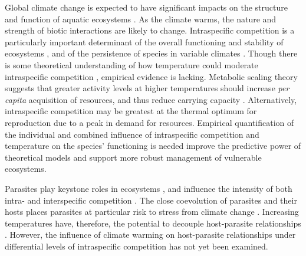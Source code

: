 Global climate change is expected to have significant impacts on the structure and function of aquatic ecosystems \citep{carpenter2011, ogorman2012}. As the climate warms, the nature and strength of biotic interactions are likely to change. Intraspecific competition is a particularly important determinant of  the overall functioning and stability of ecosystems \citep{barabas2016}, and of the persistence of species in variable climates \citep{pilfold2014, stenseth2015}. Though there is some theoretical understanding of how temperature could moderate intraspecific competition \citep{amarasekare2015}, empirical evidence is lacking. Metabolic scaling theory suggests that greater activity levels at higher temperatures should increase \emph{per capita} acquisition of resources, and thus reduce carrying capacity \citep{savage2004}. Alternatively, intraspecific competition may be greatest at the thermal optimum for reproduction due to a peak in demand for resources. Empirical quantification of the individual and combined influence of intraspecific competition and temperature on the species' functioning is needed improve the predictive power of theoretical models and support more robust management of vulnerable ecosystems. 

Parasites play keystone roles in ecosystems \citep{hatcher2008}, and influence the intensity of both intra- and interspecific competition \citep{yan1995, macneil2003}. The close coevolution of parasites and their hosts places parasites at particular risk to stress from climate change \citep{carlson2017}. Increasing temperatures have, therefore, the potential to decouple host-parasite relationships \citep{goedknegt2015, strepparava2017}. However, the influence of climate warming on host-parasite relationships under differential levels of intraspecific competition has not yet been examined. 


